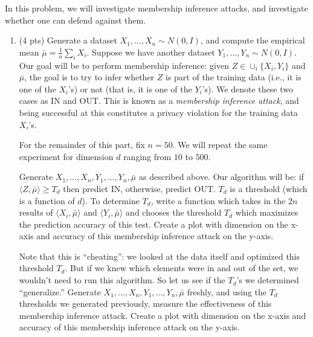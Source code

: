 \documentclass[10pt,letter,notitlepage]{article}
\newcounter{exercise}
\begin{document}
\begin{exercise}
  In this problem, we will investigate membership inference attacks, and investigate whether one can defend against them.
	\begin{enumerate}[label=\alph*)]
    \item (4 pts)
      Generate a dataset $X_1, \dots, X_n \sim N(0, I)$, and compute the empirical mean $\bar \mu = \frac{1}{n} \sum_i X_i$.
      Suppose we have another dataset $Y_1, \dots, Y_n \sim N(0, I)$. 
      Our goal will be to perform membership inference: given $Z \in \cup_i \{X_i, Y_i\}$ and $\bar \mu$, the goal is to try to infer whether $Z$ is part of the training data (i.e., it is one of the $X_i$'s) or not (that is, it is one of the $Y_i$'s). 
      We denote these two cases as IN and OUT.
      This is known as a \emph{membership inference attack}, and being successful at this constitutes a privacy violation for the training data $X_i$'s. 

      For the remainder of this part, fix $n = 50$.
      We will repeat the same experiment for dimension $d$ ranging from $10$ to $500$. 

      Generate $X_1, \dots, X_n, Y_1, \dots, Y_n, \bar \mu$ as described above. 
      Our algorithm will be: if $\langle Z, \bar \mu \rangle \geq T_d$ then predict IN, otherwise, predict OUT.
      $T_d$ is a threshold (which is a function of $d$).
      To determine $T_d$, write a function which takes in the $2n$ results of $\langle X_i, \bar \mu \rangle$ and $\langle Y_i, \bar \mu \rangle$ and chooses the threshold $T_d$ which maximizes the prediction accuracy of this test.
      Create a plot with dimension on the x-axis and accuracy of this membership inference attack on the y-axis.

      Note that this is ``cheating'': we looked at the data itself and optimized this threshold $T_d$.
      But if we knew which elements were in and out of the set, we wouldn't need to run this algorithm.
      So let us see if the $T_d$'s we determined ``generalize.''
      Generate $X_1, \dots, X_n, Y_1, \dots, Y_n, \bar \mu$ freshly, and using the $T_d$ thresholds we generated previously, measure the effectiveness of this membership inference attack.
      Create a plot with dimension on the x-axis and accuracy of this membership inference attack on the y-axis.


\end{enumerate}
\end{exercise}
\end{document}
